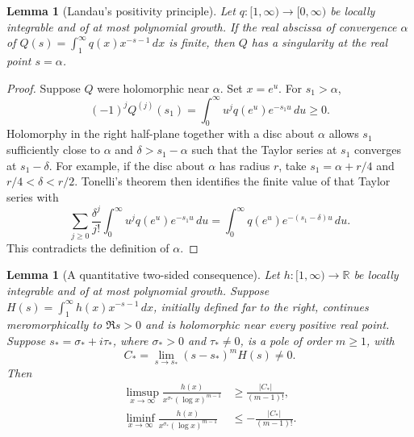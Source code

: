 \documentclass[11pt]{article}
\newtheorem{lemma}[theorem]{Lemma}
\theoremstyle{remark}\newtheorem{remark}[theorem]{Remark}
\numberwithin{equation}{section}
\begin{document}
\begin{lemma}[Landau's positivity principle]\label{udp:tw:lem:landau}
Let $q:[1,\infty)\to[0,\infty)$ be locally integrable and of at most
polynomial growth. If the real abscissa of convergence $\alpha$ of
$Q(s)=\int_1^\infty q(x)x^{-s-1}\,dx$ is finite, then $Q$ has a
singularity at the real point $s=\alpha$.
\end{lemma}

\begin{proof}
Suppose $Q$ were holomorphic near $\alpha$. Set $x=e^u$.
For $s_1>\alpha$,
\[
 (-1)^jQ^{(j)}(s_1)
 =\int_0^\infty u^j q(e^u)e^{-s_1u}\,du\ge0.
\]
Holomorphy in the right half-plane together with a disc about $\alpha$
allows $s_1$ sufficiently close to $\alpha$ and $\delta>s_1-\alpha$
such that the Taylor series at $s_1$ converges at $s_1-\delta$.
For example, if the disc about $\alpha$ has radius $r$, take
$s_1=\alpha+r/4$ and $r/4<\delta<r/2$.
Tonelli's theorem then identifies the finite value of that Taylor series with
\[
 \sum_{j\ge0}\frac{\delta^j}{j!}
 \int_0^\infty u^jq(e^u)e^{-s_1u}\,du
 =\int_0^\infty q(e^u)e^{-(s_1-\delta)u}\,du.
\]
This contradicts the definition of $\alpha$.
\end{proof}

\begin{lemma}[A quantitative two-sided consequence]
\label{udp:tw:lem:quantitative}
Let $h:[1,\infty)\to\mathbb R$ be locally integrable and of at most
polynomial growth. Suppose
$H(s)=\int_1^\infty h(x)x^{-s-1}\,dx$, initially defined far to the
right, continues meromorphically to $\Re s>0$ and is holomorphic near
every positive real point. Suppose $s_*=\sigma_*+i\tau_*$, where
$\sigma_*>0$ and $\tau_*\ne0$, is a pole of order $m\ge1$, with
\[
 C_*=\lim_{s\to s_*}(s-s_*)^mH(s)\ne0.
\]
Then
\begin{align}
 \limsup_{x\to\infty}
 \frac{h(x)}{x^{\sigma_*}(\log x)^{m-1}}
 &\ge\frac{|C_*|}{(m-1)!},\nonumber\\
 \liminf_{x\to\infty}
 \frac{h(x)}{x^{\sigma_*}(\log x)^{m-1}}
 &\le-\frac{|C_*|}{(m-1)!}.
 \label{udp:tw:eq:quantitative-landau}
\end{align}
\end{lemma}
\end{document}
